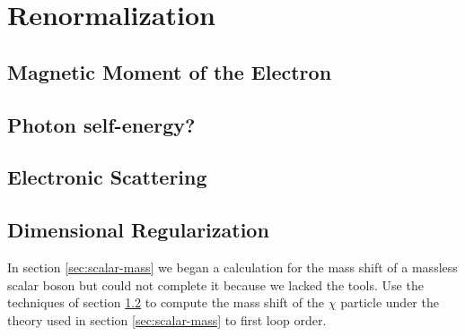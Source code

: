 \chapter{Renormalization}
\label{chap:renormalization}

\section{Magnetic Moment of the Electron}

\section{Photon self-energy?}
\label{sec:mass-shift}

\section{Electronic Scattering}

\section{Dimensional Regularization}

\begin{problem}
  In section \ref{sec:scalar-mass} we began a calculation for the mass shift of a massless scalar boson but could not complete it because we lacked the tools. Use the techniques of section \ref{sec:mass-shift} to compute the mass shift of the $\chi$ particle under the theory used in section \ref{sec:scalar-mass} to first loop order.
\end{problem}
